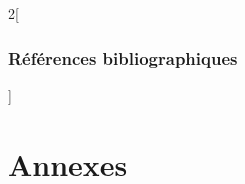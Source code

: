 \documentclass[a4paper,12pt,twoside]{article}\usepackage[]{graphicx}\usepackage[]{color}
\begin{document}
\begin {bibunit} [newbst]
\begin{otherlanguage}{english}
	\singlespacing
	\begin{multicols}{2}[\section{Références bibliographiques}]
		\small
		\def\section*#1{}
		\putbib [Bibliographie]
	\end{multicols}
\end{otherlanguage}

\end {bibunit}




\newpage
\part*{Annexes}
\end{document}

